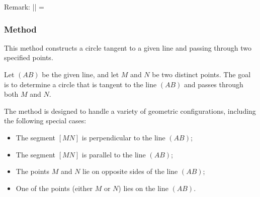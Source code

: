 \begin{tkzexample}[vbox]

\begin{center}
\end{center}
\end{tkzexample}


Remark: || = 

\subsubsection{Method }
\label{ssub:c_l_pp}

This method constructs a circle tangent to a given line and passing through two specified points.

\medskip
\noindent
Let $(AB)$ be the given line, and let $M$ and $N$ be two distinct points. The goal is to determine a circle that is tangent to the line $(AB)$ and passes through both $M$ and $N$.

\medskip
\noindent
The method is designed to handle a variety of geometric configurations, including the following special cases:

\begin{itemize}
  \item The segment $[MN]$ is perpendicular to the line $(AB)$;
  \item The segment $[MN]$ is parallel to the line $(AB)$;
  \item The points $M$ and $N$ lie on opposite sides of the line $(AB)$;
  \item One of the points (either $M$ or $N$) lies on the line $(AB)$.
\end{itemize}

